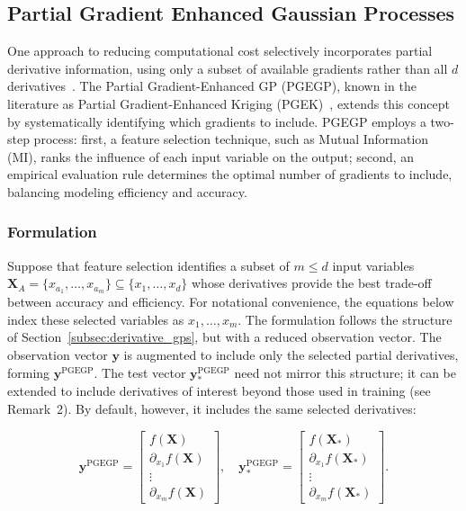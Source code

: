 \documentclass[12pt]{article}
\begin{document}
\subsection{Partial Gradient Enhanced Gaussian Processes}
\label{subsec:pgegp}
One approach to reducing computational cost selectively incorporates partial derivative information, using only a subset of available gradients rather than all $d$ derivatives~\cite{Ulaganathan2016-xq, Ulaganathan2014-yh}. The Partial Gradient-Enhanced GP (PGEGP), known in the literature as Partial Gradient-Enhanced Kriging (PGEK)~\cite{CHEN201915}, extends this concept by systematically identifying which gradients to include. PGEGP employs a two-step process: first, a feature selection technique, such as Mutual Information (MI), ranks the influence of each input variable on the output; second, an empirical evaluation rule determines the optimal number of gradients to include, balancing modeling efficiency and accuracy.

\subsubsection{Formulation}
\label{subsubsec:pgegp_formulation}

Suppose that feature selection identifies a subset of $m \leq d$ input variables $\mathbf{X}_A = \{x_{a_1}, \ldots, x_{a_m}\} \subseteq \{x_1, \ldots, x_d\}$ whose derivatives provide the best trade-off between accuracy and efficiency. For notational convenience, the equations below index these selected variables as $x_1, \ldots, x_m$. The formulation follows the structure of Section~\ref{subsec:derivative_gps}, but with a reduced observation vector. The observation vector $\mathbf{y}$ is augmented to include only the selected partial derivatives, forming $\mathbf{y}^{\text{PGEGP}}$. The test vector $\mathbf{y}^{\text{PGEGP}}_*$ need not mirror this structure; it can be extended to include derivatives of interest beyond those used in training (see Remark~2). By default, however, it includes the same selected derivatives:

\begin{equation}
	\label{eqn:pgegp_aug_vectors}
	\mathbf{y}^{\text{PGEGP}} = \begin{bmatrix} f(\mathbf{X}) \\ \partial_{x_1} f(\mathbf{X}) \\ \vdots \\ \partial_{x_m} f(\mathbf{X}) \end{bmatrix}, \quad
	\mathbf{y}^{\text{PGEGP}}_* = \begin{bmatrix} f(\mathbf{X}_*) \\ \partial_{x_1} f(\mathbf{X}_*) \\ \vdots \\ \partial_{x_m} f(\mathbf{X}_*) \end{bmatrix}.
\end{equation}
\end{document}

